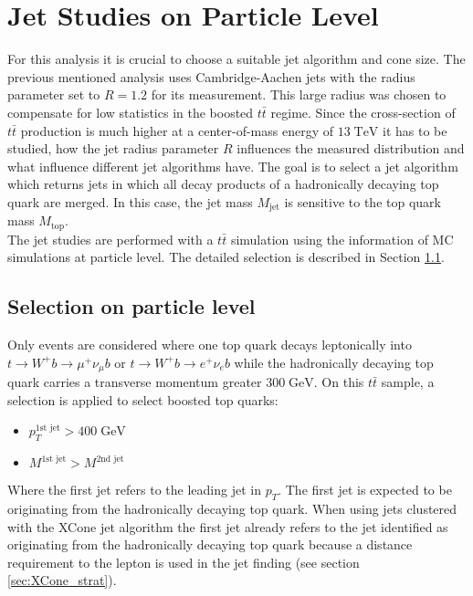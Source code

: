 \section{Jet Studies on Particle Level}
\label{sec:jet_studies}
	For this analysis it is crucial to choose a suitable jet algorithm and cone size. The previous mentioned analysis \cite{torben_paper} uses Cambridge-Aachen jets with the radius parameter set to $R=1.2$ for its measurement. This large radius was chosen to compensate for low statistics in the boosted $t\bar{t}$ regime. Since the cross-section of $t\bar{t}$ production is much higher at a center-of-mass energy of $13\;\text{TeV}$ it has to be studied, how the jet radius parameter $R$ influences the measured distribution and what influence different jet algorithms have. The goal is to select a jet algorithm which returns jets in which all decay products of a hadronically decaying top quark are merged. In this case, the jet mass $M_\text{jet}$ is sensitive to the top quark mass $M_\text{top}$.
	\\
	The jet studies are performed with a $t\bar{t}$ simulation using the information of MC simulations at particle level. The detailed selection is described in Section \ref{sec:GenSel}.

\subsection{Selection on particle level}
\label{sec:GenSel}
	Only events are considered where one top quark decays leptonically into $t\rightarrow W^{+} b\rightarrow \mu^{+} \nu_{\mu} b$ or $t\rightarrow W^{+} b\rightarrow e^{+} \nu_e b$ while the hadronically decaying top quark carries a transverse momentum greater $300\;\text{GeV}$. On this $t\bar{t}$ sample, a selection is applied to select boosted top quarks:
	\begin{itemize}
	\item $p_T^{\text{1st jet}} > 400\;\text{GeV}$ 
	\item $M^{\text{1st jet}} > M^{\text{2nd jet}}$
	\end{itemize}
	Where the first jet refers to the leading jet in $p_T$. The first jet is expected to be originating from the hadronically decaying top quark. When using jets clustered with the XCone jet algorithm the first jet already refers to the jet identified as originating from the hadronically decaying top quark because a distance requirement to the lepton is used in the jet finding (see section \ref{sec:XCone_strat}).
